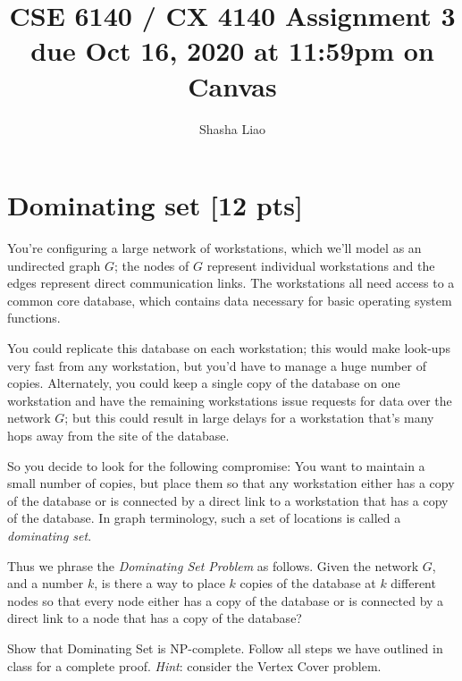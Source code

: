 \documentclass{article}
\title{CSE 6140 / CX 4140 Assignment 3\\due Oct 16, 2020 at 11:59pm on Canvas }
\author{Shasha Liao}
\date{}
\begin{document}
\maketitle


\section{Dominating set [12 pts]}
You’re configuring a large network of workstations, which we’ll model as
an undirected graph $G$; the nodes of $G$ represent individual workstations
and the edges represent direct communication links. The workstations all
need access to a common core database, which contains data necessary
for basic operating system functions.

You could replicate this database on each workstation; this would
make look-ups very fast from any workstation, but you’d have to manage
a huge number of copies. Alternately, you could keep a single copy of the
database on one workstation and have the remaining workstations issue
requests for data over the network $G$; but this could result in large delays
for a workstation that’s many hops away from the site of the database.

So you decide to look for the following compromise: You want to
maintain a small number of copies, but place them so that any workstation
either has a copy of the database or is connected by a direct link to a
workstation that has a copy of the database. In graph terminology, such
a set of locations is called a {\em dominating set}.

Thus we phrase the {\em Dominating Set Problem} as follows. Given the
network $G$, and a number $k$, is there a way to place $k$ copies of the database
at $k$ different nodes so that every node either has a copy of the database
or is connected by a direct link to a node that has a copy of the database?

Show that Dominating Set is NP-complete. Follow all steps we have outlined in class for a complete proof. \emph{Hint}: consider the Vertex Cover problem.
\end{document}
